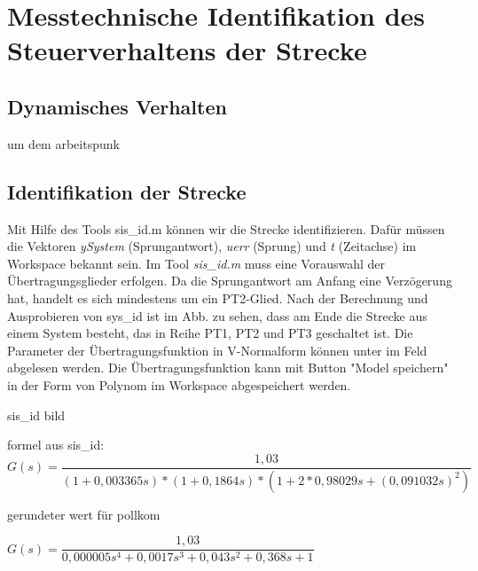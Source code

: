 








\newpage
[Perkowski]
\section{Messtechnische Identifikation des Steuerverhaltens der Strecke}


\subsection{Dynamisches Verhalten}
um dem arbeitspunk

\subsection{Identifikation der Strecke}
Mit Hilfe des Tools sis\_id.m können wir die Strecke identifizieren. Dafür müssen die Vektoren \textit{ySystem} (Sprungantwort), \textit{uerr} (Sprung) und \textit{t} (Zeitachse) im Workspace bekannt sein. Im Tool \textit{sis\_id.m} muss eine Vorauswahl der Übertragungsglieder erfolgen. Da die Sprungantwort am Anfang eine Verzögerung hat, handelt es sich mindestens um ein PT2-Glied. Nach der Berechnung und Ausprobieren von sys\_id ist im Abb. zu sehen, dass am Ende die Strecke aus einem System besteht, das in Reihe PT1, PT2 und PT3 geschaltet ist. Die Parameter der Übertragungsfunktion in V-Normalform können unter im Feld abgelesen werden. Die Übertragungsfunktion kann mit Button "Model speichern" in der Form von Polynom im Workspace abgespeichert werden.


sis\_id bild


formel aus sis\_id: \\

$ G(s) = \dfrac{1,03}{(1 + 0,003365s) * (1 + 0,1864s) * (1 + 2*0,98029s + (0,091032s)^{2}) }$

gerundeter wert für pollkom

$ G(s) =  \dfrac{1,03}{0,000005s^{4} + 0,0017s^{3	} + 0,043s^{2} + 0,368s + 1 } $